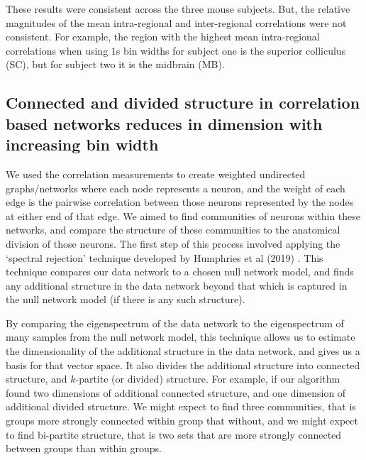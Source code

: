  These results were consistent across the three mouse subjects. But, the relative magnitudes of the mean intra-regional and inter-regional correlations were not consistent. For example, the region with the highest mean intra-regional correlations when using $1$s bin widths for subject one is the superior colliculus (SC), but for subject two it is the midbrain (MB).

  \subsection{Connected and divided structure in correlation based networks reduces in dimension with increasing bin width}\label{sec:dims_result}
  We used the correlation measurements to create weighted undirected graphs/networks where each node represents a neuron, and the weight of each edge is the pairwise correlation between those neurons represented by the nodes at either end of that edge. We aimed to find communities of neurons within these networks, and compare the structure of these communities to the anatomical division of those neurons. The first step of this process involved applying the `spectral rejection' technique developed by Humphries et al (2019) \parencite{humphries}. This technique compares our data network to a chosen null network model, and finds any additional structure in the data network beyond that which is captured in the null network model (if there is any such structure).

  By comparing the eigenspectrum of the data network to the eigenspectrum of many samples from the null network model, this technique allows us to estimate the dimensionality of the additional structure in the data network, and gives us a basis for that vector space. It also divides the additional structure into connected structure, and $k$-partite (or divided) structure. For example, if our algorithm found two dimensions of additional connected structure, and one dimension of additional divided structure. We might expect to find three communities, that is groups more strongly connected within group that without, and we might expect to find bi-partite structure, that is two sets that are more strongly connected between groups than within groups.

